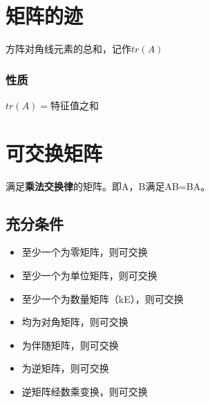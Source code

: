 \section{矩阵的迹}
方阵对角线元素的总和，记作\(tr(A)\)

\subsubsection{性质}

\(tr(A) = \)特征值之和


\section{可交换矩阵}
满足\textbf{乘法交换律}的矩阵。即A，B满足AB=BA。

\subsection{充分条件}
\begin{itemize}
    \item 至少一个为零矩阵，则可交换
    \item 至少一个为单位矩阵，则可交换
    \item 至少一个为数量矩阵（kE），则可交换
    \item 均为对角矩阵，则可交换
    \item 为伴随矩阵，则可交换
    \item 为逆矩阵，则可交换
    \item 逆矩阵经数乘变换，则可交换
\end{itemize}






